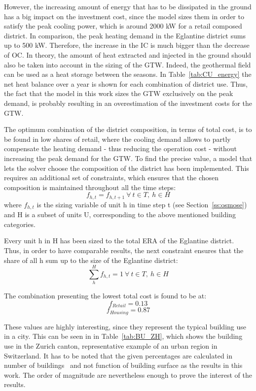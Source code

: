 \documentclass{article}
\begin{document}
However, the increasing amount of energy that has to be dissipated in the ground has a big impact on the investment cost, since the model sizes them in order to satisfy the peak cooling power, which is around 2000 kW for a retail composed district. In comparison, the peak heating demand in the Eglantine district sums up to 500 kW. Therefore, the increase in the IC is much bigger than the decrease of OC. In theory, the amount of heat extracted and injected in the ground should also be taken into account in the sizing of the GTW. Indeed, the geothermal field can be used as a heat storage between the seasons. In Table~\ref{tab:CU_energy} the net heat balance over a year is shown for each combination of district use. Thus, the fact that the model in this work sizes the GTW exclusively on the peak demand, is probably resulting in an overestimation of the investment costs for the GTW.

The optimum combination of the district composition, in terms of total cost, is to be found in low shares of retail, where the cooling demand allows to partly compensate the heating demand - thus reducing the operation cost - without increasing the peak demand for the GTW. To find the precise value, a model that lets the solver choose the composition of the district has been implemented. This requires an additional set of constraints, which ensures that the chosen composition is maintained throughout all the time steps:
\begin{equation}
f_{h,t} = f_{h,t+1} \ \forall \ t \in T, \ h \in H
\end{equation}
where $f_{h,t}$ is the sizing variable of unit h in time step t (see Section~\ref{ss:osmose}) and H is a subset of units U, corresponding to the above mentioned building categories.

Every unit h in H has been sized to the total ERA of the Eglantine district. Thus, in order to have comparable results, the next constraint ensures that the share of all h sum up to the size of the Eglantine district:
\begin{equation}
\sum_{h}^{H} f_{h,t} = 1 \ \forall \ t \in T, \ h \in H
\end{equation}

The combination presenting the lowest total cost is found to be at:
$$f_{Retail} = 0.13 $$
$$f_{Housing} = 0.87 $$

These values are highly interesting, since they represent the typical building use in a city. This can be seen in in Table~\ref{tab:BU_ZH}, which shows the building use in the Zurich canton, representative example of an urban region in Switzerland. It has to be noted that the given percentages are calculated in number of buildings~\cite{endk-konferenzkantonalerenergiedirektorenEnergieverbrauchGebaudenFact2014} and not function of building surface as the results in this work. The order of magnitude are nevertheless enough to prove the interest of the results.
\end{document}
